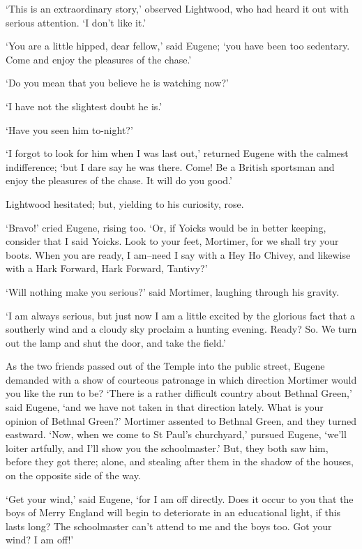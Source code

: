 ‘This is an extraordinary story,’ observed Lightwood, who had heard it
out with serious attention. ‘I don’t like it.’

‘You are a little hipped, dear fellow,’ said Eugene; ‘you have been too
sedentary. Come and enjoy the pleasures of the chase.’

‘Do you mean that you believe he is watching now?’

‘I have not the slightest doubt he is.’

‘Have you seen him to-night?’

‘I forgot to look for him when I was last out,’ returned Eugene with the
calmest indifference; ‘but I dare say he was there. Come! Be a British
sportsman and enjoy the pleasures of the chase. It will do you good.’

Lightwood hesitated; but, yielding to his curiosity, rose.

‘Bravo!’ cried Eugene, rising too. ‘Or, if Yoicks would be in better
keeping, consider that I said Yoicks. Look to your feet, Mortimer, for
we shall try your boots. When you are ready, I am--need I say with a Hey
Ho Chivey, and likewise with a Hark Forward, Hark Forward, Tantivy?’

‘Will nothing make you serious?’ said Mortimer, laughing through his
gravity.

‘I am always serious, but just now I am a little excited by the glorious
fact that a southerly wind and a cloudy sky proclaim a hunting evening.
Ready? So. We turn out the lamp and shut the door, and take the field.’

As the two friends passed out of the Temple into the public street,
Eugene demanded with a show of courteous patronage in which direction
Mortimer would you like the run to be? ‘There is a rather difficult
country about Bethnal Green,’ said Eugene, ‘and we have not taken in
that direction lately. What is your opinion of Bethnal Green?’ Mortimer
assented to Bethnal Green, and they turned eastward. ‘Now, when we come
to St Paul’s churchyard,’ pursued Eugene, ‘we’ll loiter artfully, and
I’ll show you the schoolmaster.’ But, they both saw him, before they got
there; alone, and stealing after them in the shadow of the houses, on
the opposite side of the way.

‘Get your wind,’ said Eugene, ‘for I am off directly. Does it occur
to you that the boys of Merry England will begin to deteriorate in an
educational light, if this lasts long? The schoolmaster can’t attend to
me and the boys too. Got your wind? I am off!’


